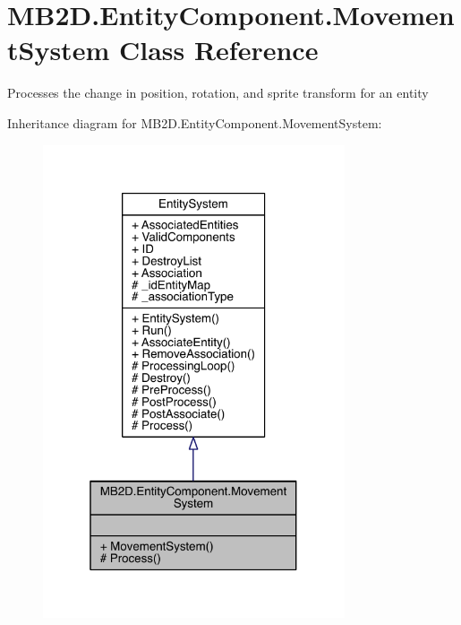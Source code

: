 \hypertarget{class_m_b2_d_1_1_entity_component_1_1_movement_system}{}\section{M\+B2\+D.\+Entity\+Component.\+Movement\+System Class Reference}
\label{class_m_b2_d_1_1_entity_component_1_1_movement_system}


Processes the change in position, rotation, and sprite transform for an entity  




Inheritance diagram for M\+B2\+D.\+Entity\+Component.\+Movement\+System\+:\nopagebreak
\begin{figure}[H]
\begin{center}
\leavevmode
\includegraphics[width=253pt]{class_m_b2_d_1_1_entity_component_1_1_movement_system__inherit__graph}
\end{center}
\end{figure}


